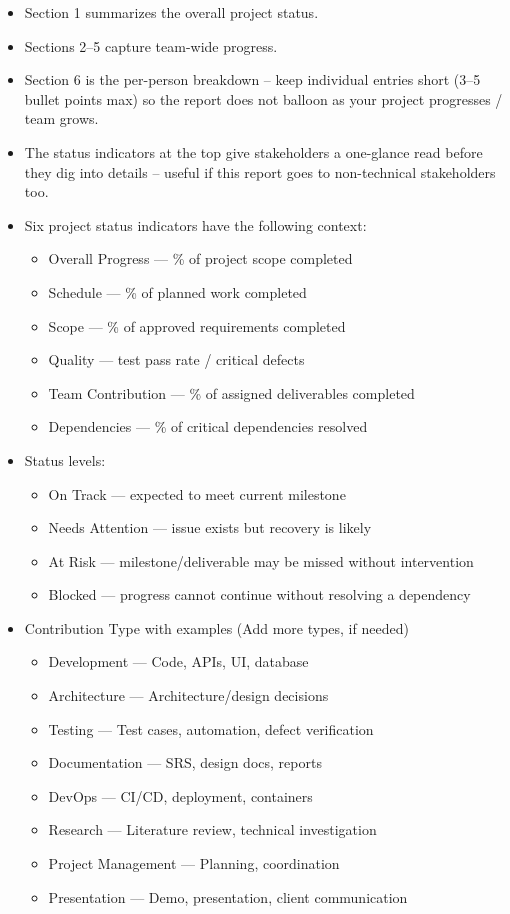 \documentclass[11pt,a4paper]{article}
\begin{document}
\begin{itemize}
    \item Section 1 summarizes the overall project status.
    \item Sections 2--5 capture team-wide progress.
    \item Section 6 is the per-person breakdown -- keep individual entries short (3--5 bullet points max) so the report does not balloon as your project progresses / team grows.
    \item The status indicators at the top give stakeholders a one-glance read before they dig into details -- useful if this report goes to non-technical stakeholders too.
    \item Six project status indicators have the following context:
    \begin{itemize}
        \item Overall Progress --- \% of project scope completed
        \item Schedule --- \% of planned work completed
        \item Scope --- \% of approved requirements completed
        \item Quality --- test pass rate / critical defects
        \item Team Contribution --- \% of assigned deliverables completed
        \item Dependencies --- \% of critical dependencies resolved
    \end{itemize}
    \item Status levels:
    \begin{itemize}
        \item On Track --- expected to meet current milestone
        \item Needs Attention --- issue exists but recovery is likely
        \item At Risk --- milestone/deliverable may be missed without intervention
        \item Blocked --- progress cannot continue without resolving a dependency
    \end{itemize}
    \item Contribution Type with examples (Add more types, if needed)
    \begin{itemize}
        \item Development --- Code, APIs, UI, database
        \item Architecture --- Architecture/design decisions
        \item Testing --- Test cases, automation, defect verification
        \item Documentation --- SRS, design docs, reports
        \item DevOps --- CI/CD, deployment, containers
        \item Research --- Literature review, technical investigation
        \item Project Management --- Planning, coordination
        \item Presentation --- Demo, presentation, client communication
    \end{itemize}

\end{itemize}
\end{document}
